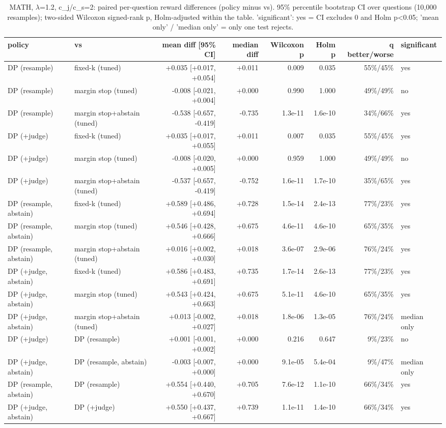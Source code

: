 \begin{table}[t]
\centering
\small
\caption{MATH, $\lambda$=1.2, c\_j/c\_s=2: paired per-question reward differences (policy minus vs). 95\% percentile bootstrap CI over questions (10,000 resamples); two-sided Wilcoxon signed-rank p, Holm-adjusted within the table. 'significant': yes = CI excludes 0 and Holm p<0.05; 'mean only' / 'median only' = only one test rejects.}
\label{tab:significance_math_lam1.2}
\begin{tabular}{llrrrrrl}
\toprule
policy & vs & mean diff [95\% CI] & median diff & Wilcoxon p & Holm p & q better/worse & significant \\
\midrule
DP (resample) & fixed-k (tuned) & +0.035 [+0.017, +0.054] & +0.011 & 0.009 & 0.035 & 55\%/45\% & yes \\
DP (resample) & margin stop (tuned) & -0.008 [-0.021, +0.004] & +0.000 & 0.990 & 1.000 & 49\%/49\% & no \\
DP (resample) & margin stop+abstain (tuned) & -0.538 [-0.657, -0.419] & -0.735 & 1.3e-11 & 1.6e-10 & 34\%/66\% & yes \\
DP (+judge) & fixed-k (tuned) & +0.035 [+0.017, +0.055] & +0.011 & 0.007 & 0.035 & 55\%/45\% & yes \\
DP (+judge) & margin stop (tuned) & -0.008 [-0.020, +0.005] & +0.000 & 0.959 & 1.000 & 49\%/49\% & no \\
DP (+judge) & margin stop+abstain (tuned) & -0.537 [-0.657, -0.419] & -0.752 & 1.6e-11 & 1.7e-10 & 35\%/65\% & yes \\
DP (resample, abstain) & fixed-k (tuned) & +0.589 [+0.486, +0.694] & +0.728 & 1.5e-14 & 2.4e-13 & 77\%/23\% & yes \\
DP (resample, abstain) & margin stop (tuned) & +0.546 [+0.428, +0.666] & +0.675 & 4.6e-11 & 4.6e-10 & 65\%/35\% & yes \\
DP (resample, abstain) & margin stop+abstain (tuned) & +0.016 [+0.002, +0.030] & +0.018 & 3.6e-07 & 2.9e-06 & 76\%/24\% & yes \\
DP (+judge, abstain) & fixed-k (tuned) & +0.586 [+0.483, +0.691] & +0.735 & 1.7e-14 & 2.6e-13 & 77\%/23\% & yes \\
DP (+judge, abstain) & margin stop (tuned) & +0.543 [+0.424, +0.663] & +0.675 & 5.1e-11 & 4.6e-10 & 65\%/35\% & yes \\
DP (+judge, abstain) & margin stop+abstain (tuned) & +0.013 [-0.002, +0.027] & +0.018 & 1.8e-06 & 1.3e-05 & 76\%/24\% & median only \\
DP (+judge) & DP (resample) & +0.001 [-0.001, +0.002] & +0.000 & 0.216 & 0.647 & 9\%/23\% & no \\
DP (+judge, abstain) & DP (resample, abstain) & -0.003 [-0.007, +0.000] & +0.000 & 9.1e-05 & 5.4e-04 & 9\%/47\% & median only \\
DP (resample, abstain) & DP (resample) & +0.554 [+0.440, +0.670] & +0.705 & 7.6e-12 & 1.1e-10 & 66\%/34\% & yes \\
DP (+judge, abstain) & DP (+judge) & +0.550 [+0.437, +0.667] & +0.739 & 1.1e-11 & 1.4e-10 & 66\%/34\% & yes \\
\bottomrule
\end{tabular}
\end{table}

